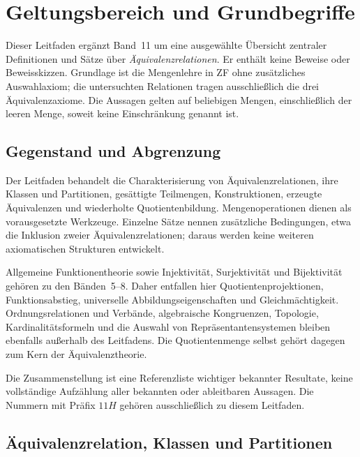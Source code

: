 \chapter{Geltungsbereich und Grundbegriffe}

Dieser Leitfaden ergänzt Band~11 um eine ausgewählte Übersicht
zentraler Definitionen und Sätze über \emph{Äquivalenzrelationen}.
Er enthält keine Beweise oder Beweisskizzen. Grundlage ist die
Mengenlehre in ZF ohne zusätzliches Auswahlaxiom; die untersuchten
Relationen tragen ausschließlich die drei Äquivalenzaxiome.
Die Aussagen gelten auf beliebigen Mengen, einschließlich der
leeren Menge, soweit keine Einschränkung genannt ist.

\section{Gegenstand und Abgrenzung}

Der Leitfaden behandelt die Charakterisierung von Äquivalenzrelationen,
ihre Klassen und Partitionen, gesättigte Teilmengen, Konstruktionen,
erzeugte Äquivalenzen und wiederholte Quotientenbildung.
Mengenoperationen dienen als vorausgesetzte Werkzeuge.
Einzelne Sätze nennen zusätzliche Bedingungen, etwa die Inklusion
zweier Äquivalenzrelationen; daraus werden keine weiteren
axiomatischen Strukturen entwickelt.

Allgemeine Funktionentheorie sowie Injektivität, Surjektivität
und Bijektivität gehören zu den Bänden~5--8. Daher entfallen hier
Quotientenprojektionen, Funktionsabstieg, universelle
Abbildungseigenschaften und Gleichmächtigkeit.
Ordnungsrelationen und Verbände, algebraische Kongruenzen,
Topologie, Kardinalitätsformeln und die Auswahl von
Repräsentantensystemen bleiben ebenfalls außerhalb des Leitfadens.
Die Quotientenmenge selbst gehört dagegen zum Kern der
Äquivalenztheorie.

Die Zusammenstellung ist eine Referenzliste wichtiger bekannter
Resultate, keine vollständige Aufzählung aller bekannten oder
ableitbaren Aussagen. Die Nummern mit Präfix $11H$ gehören
ausschließlich zu diesem Leitfaden.

\section{Äquivalenzrelation, Klassen und Partitionen}

